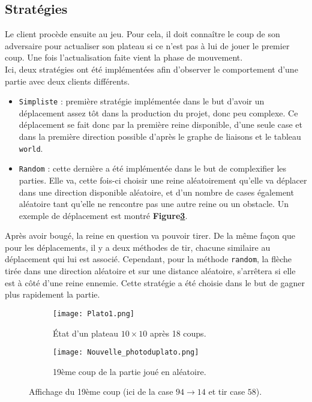 \subsection{Stratégies}
\label{subsec:client_strat}

Le client procède ensuite au jeu. Pour cela, il doit connaître le coup de son adversaire pour actualiser son plateau si ce n'est pas à lui de jouer le premier coup. Une fois l'actualisation faite vient la phase de mouvement.\\
Ici, deux stratégies ont été implémentées afin d'observer le comportement d'une partie avec deux clients différents. 

\begin{itemize}
    \item \texttt{Simpliste} : première stratégie implémentée dans le but d'avoir un déplacement assez tôt dans la production du projet, donc peu complexe. Ce déplacement se fait donc par la première reine disponible, d'une seule case et dans la première direction possible d'après le graphe de liaisons et le tableau \texttt{world}.
    \medbreak
    \item \texttt{Random} : cette dernière a été implémentée dans le but de complexifier les parties. Elle va, cette fois-ci choisir une reine aléatoirement qu'elle va déplacer dans une direction disponible aléatoire, et d'un nombre de cases également aléatoire tant qu'elle ne rencontre pas une autre reine ou un obstacle. Un exemple de déplacement est montré \textbf{Figure\ref{fig:gamestrat}}. 
    \medbreak
\end{itemize}

Après avoir bougé, la reine en question va pouvoir tirer. De la même façon que pour les déplacements, il y a deux méthodes de tir, chacune similaire au déplacement qui lui est associé. Cependant, pour la méthode \texttt{random}, la flèche tirée dans une direction aléatoire et sur une distance aléatoire, s'arrêtera si elle est à côté d'une reine ennemie. Cette stratégie a été choisie dans le but de gagner plus rapidement la partie.

\begin{figure}[H]
    \centering
    \begin{subfigure}{0.4\textwidth}
        \centering
        \texttt{[image: Plato1.png]}
        \caption{État d'un plateau $10 \times 10$ après 18 coups. }
        \label{subfig:toblo}
    \end{subfigure}
    \hspace{1cm}
    \begin{subfigure}{0.52\textwidth}
        \centering
        \texttt{[image: Nouvelle\_photoduplato.png]}
        \caption{19ème coup de la partie joué en aléatoire.}
        \label{subfig: coupdeouf}
    \end{subfigure}
    \caption{Affichage du 19ème coup (ici de la case $94 \rightarrow 14$ et tir case $58$).}
    \label{fig:gamestrat}
\end{figure}

